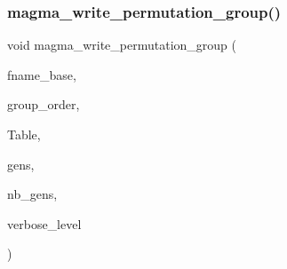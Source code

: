 \mbox{\label{magma__interface_8_c_a0079751a442750cbba5b5a13f738b91c}} 
\subsubsection{\texorpdfstring{magma\+\_\+write\+\_\+permutation\+\_\+group()}{magma\_write\_permutation\_group()}}
{\footnotesize\ttfamily void magma\+\_\+write\+\_\+permutation\+\_\+group (\begin{DoxyParamCaption}\item[{const \mbox{\hyperlink{galois_8h_ab6cc7b4aeb6ea31aba2b3fbfc83ff5e6}{B\+Y\+TE}} $\ast$}]{fname\+\_\+base,  }\item[{\mbox{\hyperlink{galois_8h_a09fddde158a3a20bd2dcadb609de11dc}{I\+NT}}}]{group\+\_\+order,  }\item[{\mbox{\hyperlink{galois_8h_a09fddde158a3a20bd2dcadb609de11dc}{I\+NT}} $\ast$}]{Table,  }\item[{\mbox{\hyperlink{galois_8h_a09fddde158a3a20bd2dcadb609de11dc}{I\+NT}} $\ast$}]{gens,  }\item[{\mbox{\hyperlink{galois_8h_a09fddde158a3a20bd2dcadb609de11dc}{I\+NT}}}]{nb\+\_\+gens,  }\item[{\mbox{\hyperlink{galois_8h_a09fddde158a3a20bd2dcadb609de11dc}{I\+NT}}}]{verbose\+\_\+level }\end{DoxyParamCaption})}

\mbox{\label{magma__interface_8_c_a58fde0545d69e8dbea05b2dd3f231b39}} 
